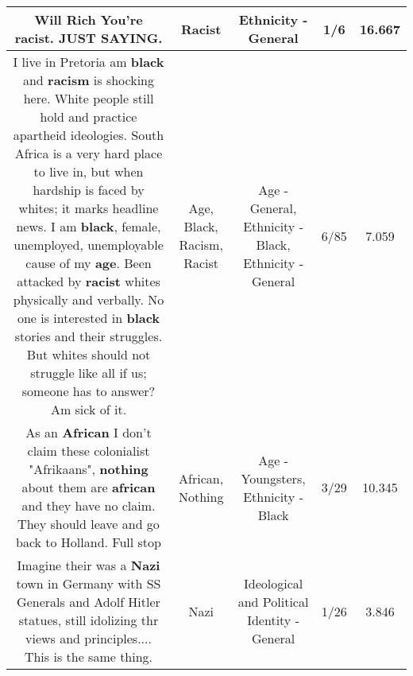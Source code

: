 \documentclass[11pt]{article}
\newlength\mylength
\begin{document}
\begin{center}
\begin{longtable}{|C{.65\mylength}|C{.30\mylength}|C{.12\mylength}|C{.12\mylength}|C{.12\mylength}|}
  \small Will Rich You're \textbf{racist}. JUST SAYING.\normalsize   & Racist & Ethnicity - General & 1/6 & 16.667 \\  \hline
  \small I live in Pretoria am \textbf{black} and \textbf{racism} is shocking here. White people still hold and practice apartheid ideologies. South Africa is a very hard place to live in, but when hardship is faced by whites; it marks headline news. I am \textbf{black}, female, unemployed, unemployable cause of my \textbf{age}. Been attacked by \textbf{racist} whites physically and verbally. No one is interested in \textbf{black} stories and their struggles. But whites should not struggle like all if us; someone has to answer? Am sick of it.\normalsize   & Age, Black, Racism, Racist & Age - General, Ethnicity - Black, Ethnicity - General & 6/85 & 7.059 \\  \hline
  \small As an \textbf{African} I don't claim these colonialist "Afrikaans", \textbf{nothing} about them are \textbf{african} and they have no claim. They should leave and go back to Holland. Full stop\normalsize   & African, Nothing & Age - Youngsters, Ethnicity - Black & 3/29 & 10.345 \\  \hline
  \small Imagine their was a \textbf{Nazi} town in Germany with SS Generals and Adolf Hitler statues, still idolizing thr views and principles.... This is the same thing.\normalsize   & Nazi &  Ideological and Political Identity - General & 1/26 & 3.846 \\  \hline

\end{longtable}
\end{center}
\end{document}
